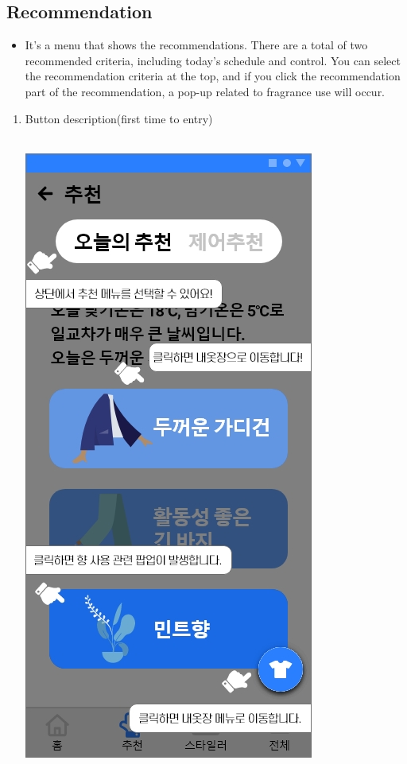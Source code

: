 \documentclass[conference]{IEEEtran}
\begin{document}
\subsection{Recommendation}
\begin{itemize}
\item[] It's a menu that shows the recommendations. There are a total of two recommended criteria, including today's schedule and control. You can select the recommendation criteria at the top, and if you click the recommendation part of the recommendation, a pop-up related to fragrance use will occur.\\
\end{itemize}
    \begin{enumerate}
    \item Button description(first time to entry) \\ \\
    \centerline{\includegraphics[scale=0.32]{추천1.jpg}}

\end{enumerate}
\end{document}
